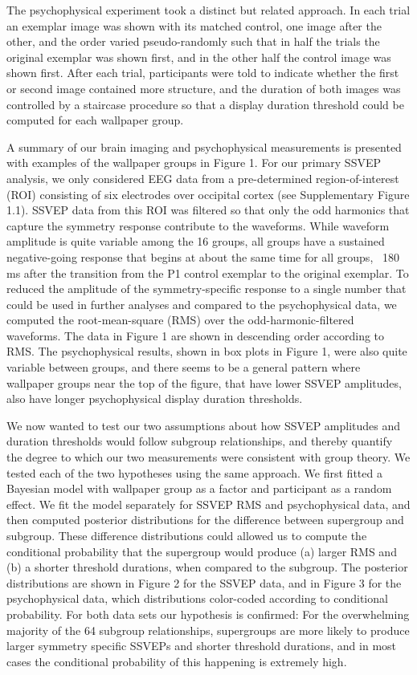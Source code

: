 \documentclass[9pt,twocolumn,twoside,lineno]{pnas-new}
\begin{document}
The psychophysical experiment took a distinct but related approach. In each trial an exemplar image was shown with its matched control, one image after the other, and the order varied pseudo-randomly such that in half the trials the original exemplar was shown first, and in the other half the control image was shown first. After each trial, participants were told to indicate whether the first or second image contained more structure, and the duration of both images was controlled by a staircase procedure so that a display duration threshold could be computed for each wallpaper group. 

A summary of our brain imaging and psychophysical measurements is presented with examples of the wallpaper groups in Figure 1. For our primary SSVEP analysis, we only considered EEG data from a pre-determined region-of-interest (ROI) consisting of six electrodes over occipital cortex (see Supplementary Figure 1.1). SSVEP data from this ROI was filtered so that only the odd harmonics that capture the symmetry response contribute to the waveforms. While waveform amplitude is quite variable among the 16 groups, all groups have a sustained negative-going response that begins at about the same time for all groups, ~180 ms after the transition from the P1 control exemplar to the original exemplar. To reduced the amplitude of the symmetry-specific response to a single number that could be used in further analyses and compared to the psychophysical data, we computed the root-mean-square (RMS) over the odd-harmonic-filtered waveforms. The data in Figure 1 are shown in descending order according to RMS. The psychophysical results, shown in box plots in Figure 1, were also quite variable between groups, and there seems to be a general pattern where wallpaper groups near the top of the figure, that have lower SSVEP amplitudes, also have longer psychophysical display duration thresholds. 

We now wanted to test our two assumptions about how SSVEP amplitudes and duration thresholds would follow subgroup relationships, and thereby quantify the degree to which our two measurements were consistent with group theory. We tested each of the two hypotheses using the same approach. We first fitted a Bayesian model with wallpaper group as a factor and participant as a random effect. We fit the model separately for SSVEP RMS and psychophysical data, and then computed posterior distributions for the difference between supergroup and subgroup. These difference distributions could allowed us to compute the conditional probability that the supergroup would produce (a) larger RMS and (b) a shorter threshold durations, when compared to the subgroup. The posterior distributions are shown in Figure 2 for the SSVEP data, and in Figure 3 for the psychophysical data, which distributions color-coded according to conditional probability. For both data sets our hypothesis is confirmed: For the overwhelming majority of the 64 subgroup relationships, supergroups are more likely to produce larger symmetry specific SSVEPs and shorter threshold durations, and in most cases the conditional probability of this happening is extremely high. 
\end{document}
